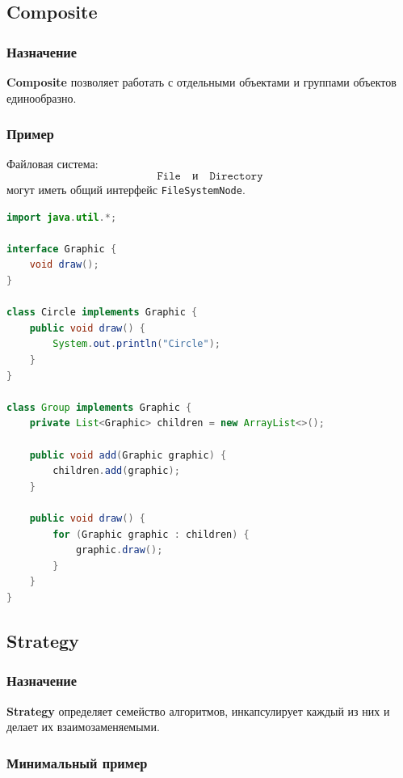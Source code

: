 \documentclass[12pt,a4paper]{article}
\begin{document}
\subsection{Composite}

\subsubsection{Назначение}

\textbf{Composite} позволяет работать с отдельными объектами и группами объектов единообразно.

\subsubsection{Пример}

Файловая система:
\[
\texttt{File} \quad \text{и} \quad \texttt{Directory}
\]
могут иметь общий интерфейс \texttt{FileSystemNode}.

\begin{lstlisting}[language=Java,caption={Composite}]
import java.util.*;

interface Graphic {
    void draw();
}

class Circle implements Graphic {
    public void draw() {
        System.out.println("Circle");
    }
}

class Group implements Graphic {
    private List<Graphic> children = new ArrayList<>();

    public void add(Graphic graphic) {
        children.add(graphic);
    }

    public void draw() {
        for (Graphic graphic : children) {
            graphic.draw();
        }
    }
}
\end{lstlisting}

\subsection{Strategy}

\subsubsection{Назначение}

\textbf{Strategy} определяет семейство алгоритмов, инкапсулирует каждый из них и делает их взаимозаменяемыми.

\subsubsection{Минимальный пример}
\end{document}
